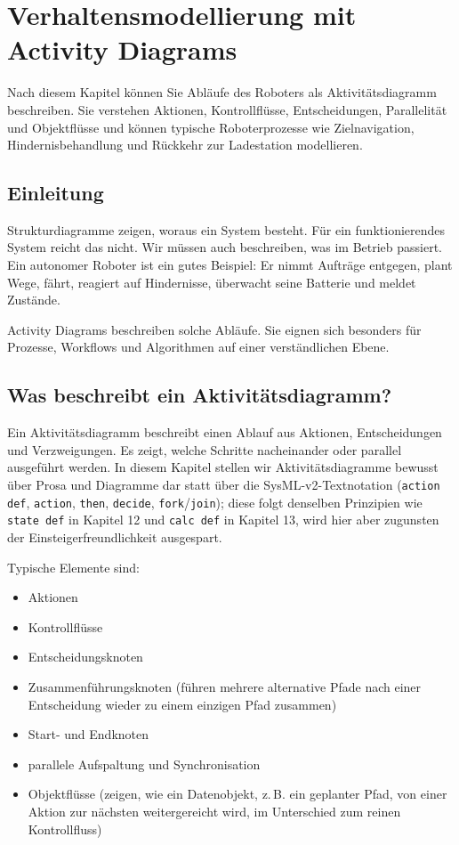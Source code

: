 \chapter{Verhaltensmodellierung mit Activity Diagrams}

\begin{lernziele}
Nach diesem Kapitel können Sie Abläufe des Roboters als Aktivitätsdiagramm beschreiben. Sie verstehen Aktionen, Kontrollflüsse, Entscheidungen, Parallelität und Objektflüsse und können typische Roboterprozesse wie Zielnavigation, Hindernisbehandlung und Rückkehr zur Ladestation modellieren.
\end{lernziele}

\section{Einleitung}
Strukturdiagramme zeigen, woraus ein System besteht. Für ein funktionierendes System reicht das nicht. Wir müssen auch beschreiben, was im Betrieb passiert. Ein autonomer Roboter ist ein gutes Beispiel: Er nimmt Aufträge entgegen, plant Wege, fährt, reagiert auf Hindernisse, überwacht seine Batterie und meldet Zustände.

Activity Diagrams beschreiben solche Abläufe. Sie eignen sich besonders für Prozesse, Workflows und Algorithmen auf einer verständlichen Ebene.

\section{Was beschreibt ein Aktivitätsdiagramm?}
Ein Aktivitätsdiagramm beschreibt einen Ablauf aus Aktionen, Entscheidungen und Verzweigungen. Es zeigt, welche Schritte nacheinander oder parallel ausgeführt werden. In diesem Kapitel stellen wir Aktivitätsdiagramme bewusst über Prosa und Diagramme dar statt über die SysML-v2-Textnotation (\texttt{action def}, \texttt{action}, \texttt{then}, \texttt{decide}, \texttt{fork}/\texttt{join}); diese folgt denselben Prinzipien wie \texttt{state def} in Kapitel 12 und \texttt{calc def} in Kapitel 13, wird hier aber zugunsten der Einsteigerfreundlichkeit ausgespart.

Typische Elemente sind:

\begin{itemize}
    \item Aktionen
    \item Kontrollflüsse
    \item Entscheidungsknoten
    \item Zusammenführungsknoten (führen mehrere alternative Pfade nach einer Entscheidung wieder zu einem einzigen Pfad zusammen)
    \item Start- und Endknoten
    \item parallele Aufspaltung und Synchronisation
    \item Objektflüsse (zeigen, wie ein Datenobjekt, z.\,B. ein geplanter Pfad, von einer Aktion zur nächsten weitergereicht wird, im Unterschied zum reinen Kontrollfluss)
\end{itemize}

